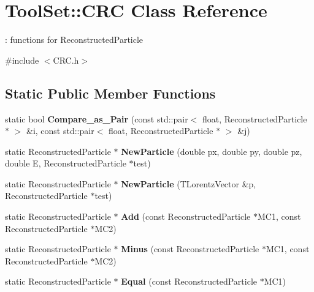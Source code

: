 \hypertarget{classToolSet_1_1CRC}{
\section{ToolSet::CRC Class Reference}
\label{classToolSet_1_1CRC}
}


: functions for ReconstructedParticle  


{\ttfamily \#include $<$CRC.h$>$}\subsection*{Static Public Member Functions}
\begin{DoxyCompactItemize}
\item 
\hypertarget{classToolSet_1_1CRC_a4c6c55db474f94060062b19b63ee6c65}{
static bool {\bfseries Compare\_\-as\_\-Pair} (const std::pair$<$ float, ReconstructedParticle $\ast$ $>$ \&i, const std::pair$<$ float, ReconstructedParticle $\ast$ $>$ \&j)}
\label{classToolSet_1_1CRC_a4c6c55db474f94060062b19b63ee6c65}

\item 
\hypertarget{classToolSet_1_1CRC_a8d42a63101bab36be0173c2a4e101b7a}{
static ReconstructedParticle $\ast$ {\bfseries NewParticle} (double px, double py, double pz, double E, ReconstructedParticle $\ast$test)}
\label{classToolSet_1_1CRC_a8d42a63101bab36be0173c2a4e101b7a}

\item 
\hypertarget{classToolSet_1_1CRC_ac054a2fae3815f1d4a24c781491f03b2}{
static ReconstructedParticle $\ast$ {\bfseries NewParticle} (TLorentzVector \&p, ReconstructedParticle $\ast$test)}
\label{classToolSet_1_1CRC_ac054a2fae3815f1d4a24c781491f03b2}

\item 
\hypertarget{classToolSet_1_1CRC_abc862ca6ed2bb7b78c4ff26316253dec}{
static ReconstructedParticle $\ast$ {\bfseries Add} (const ReconstructedParticle $\ast$MC1, const ReconstructedParticle $\ast$MC2)}
\label{classToolSet_1_1CRC_abc862ca6ed2bb7b78c4ff26316253dec}

\item 
\hypertarget{classToolSet_1_1CRC_ac3a3e5e99a15fd8b409241d30f779663}{
static ReconstructedParticle $\ast$ {\bfseries Minus} (const ReconstructedParticle $\ast$MC1, const ReconstructedParticle $\ast$MC2)}
\label{classToolSet_1_1CRC_ac3a3e5e99a15fd8b409241d30f779663}

\item 
\hypertarget{classToolSet_1_1CRC_a19c6ca3d07dbf23e55127756f63b9020}{
static ReconstructedParticle $\ast$ {\bfseries Equal} (const ReconstructedParticle $\ast$MC1)}
\label{classToolSet_1_1CRC_a19c6ca3d07dbf23e55127756f63b9020}


\end{DoxyCompactItemize}
